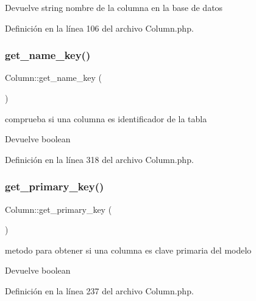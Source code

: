 \begin{DoxyReturn}{Devuelve}
string nombre de la columna en la base de datos 
\end{DoxyReturn}


Definición en la línea 106 del archivo Column.\+php.

\mbox{\label{class_column_afbe92323031606a80891038f2a833e37}} 
\subsubsection{\texorpdfstring{get\_name\_key()}{get\_name\_key()}}
{\footnotesize\ttfamily Column\+::get\+\_\+name\+\_\+key (\begin{DoxyParamCaption}{ }\end{DoxyParamCaption})}

comprueba si una columna es identificador de la tabla

\begin{DoxyReturn}{Devuelve}
boolean 
\end{DoxyReturn}


Definición en la línea 318 del archivo Column.\+php.

\mbox{\label{class_column_a596352fac897c8f8a877a67ab390df76}} 
\subsubsection{\texorpdfstring{get\_primary\_key()}{get\_primary\_key()}}
{\footnotesize\ttfamily Column\+::get\+\_\+primary\+\_\+key (\begin{DoxyParamCaption}{ }\end{DoxyParamCaption})}

metodo para obtener si una columna es clave primaria del modelo

\begin{DoxyReturn}{Devuelve}
boolean 
\end{DoxyReturn}


Definición en la línea 237 del archivo Column.\+php.

\mbox{\label{class_column_a9322fc30623d22ff4023413a43250689}} 
